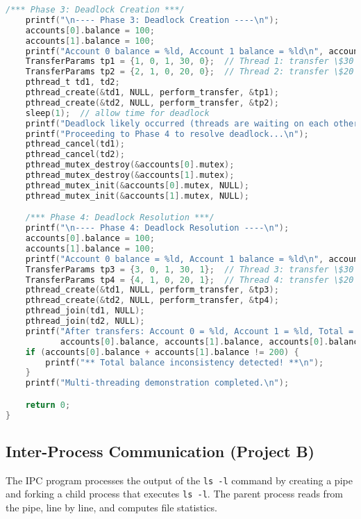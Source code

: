 \documentclass[11pt]{article}
\begin{document}
\begin{lstlisting}[language=C,caption={Main Test Runner for Multi-Threading}]
    /*** Phase 3: Deadlock Creation ***/
    printf("\n---- Phase 3: Deadlock Creation ----\n");
    accounts[0].balance = 100;
    accounts[1].balance = 100;
    printf("Account 0 balance = %ld, Account 1 balance = %ld\n", accounts[0].balance, accounts[1].balance);
    TransferParams tp1 = {1, 0, 1, 30, 0};  // Thread 1: transfer \$30 from Account 0->1
    TransferParams tp2 = {2, 1, 0, 20, 0};  // Thread 2: transfer \$20 from Account 1->0
    pthread_t td1, td2;
    pthread_create(&td1, NULL, perform_transfer, &tp1);
    pthread_create(&td2, NULL, perform_transfer, &tp2);
    sleep(1);  // allow time for deadlock
    printf("Deadlock likely occurred (threads are waiting on each other).\n");
    printf("Proceeding to Phase 4 to resolve deadlock...\n");
    pthread_cancel(td1);
    pthread_cancel(td2);
    pthread_mutex_destroy(&accounts[0].mutex);
    pthread_mutex_destroy(&accounts[1].mutex);
    pthread_mutex_init(&accounts[0].mutex, NULL);
    pthread_mutex_init(&accounts[1].mutex, NULL);

    /*** Phase 4: Deadlock Resolution ***/
    printf("\n---- Phase 4: Deadlock Resolution ----\n");
    accounts[0].balance = 100;
    accounts[1].balance = 100;
    printf("Account 0 balance = %ld, Account 1 balance = %ld\n", accounts[0].balance, accounts[1].balance);
    TransferParams tp3 = {3, 0, 1, 30, 1};  // Thread 3: transfer \$30 w/ avoidance
    TransferParams tp4 = {4, 1, 0, 20, 1};  // Thread 4: transfer \$20 w/ avoidance
    pthread_create(&td1, NULL, perform_transfer, &tp3);
    pthread_create(&td2, NULL, perform_transfer, &tp4);
    pthread_join(td1, NULL);
    pthread_join(td2, NULL);
    printf("After transfers: Account 0 = %ld, Account 1 = %ld, Total = %ld (expected 200)\n",
           accounts[0].balance, accounts[1].balance, accounts[0].balance + accounts[1].balance);
    if (accounts[0].balance + accounts[1].balance != 200) {
        printf("** Total balance inconsistency detected! **\n");
    }
    printf("Multi-threading demonstration completed.\n");

    return 0;
}
\end{lstlisting}

\subsection{Inter-Process Communication (Project B)}
The IPC program processes the output of the \texttt{ls -l} command by creating a pipe and forking a child process that executes \texttt{ls -l}. The parent process reads from the pipe, line by line, and computes file statistics.
\end{document}
